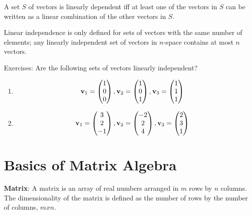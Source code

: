 \documentclass[]{book}
\theoremstyle{definition}
\theoremstyle{definition}
\theoremstyle{definition}
\theoremstyle{remark}
\begin{document}
A set \(S\) of vectors is linearly dependent iff at least one of the
vectors in \(S\) can be written as a linear combination of the other
vectors in \(S\).

Linear independence is only defined for sets of vectors with the same
number of elements; any linearly independent set of vectors in
\(n\)-space contains at most \(n\) vectors.

Exercises: Are the following sets of vectors linearly independent?

\begin{enumerate}
        \item $${\bf v}_1 = \begin{pmatrix} 1 \\ 0 \\ 0 \end{pmatrix} , {\bf v}_2 = \begin{pmatrix} 1 \\ 0 \\ 1 \end{pmatrix} , {\bf v}_3 = \begin{pmatrix} 1 \\ 1 \\ 1 \end{pmatrix} $$ 
            \phantom{Yes}
        \item $${\bf v}_1 = \begin{pmatrix} 3 \\ 2 \\ -1 \end{pmatrix} , {\bf v}_2 = \begin{pmatrix} -2 \\ 2 \\ 4 \end{pmatrix} , {\bf v}_3 = \begin{pmatrix} 2 \\ 3 \\ 1 \end{pmatrix} $$ 
\end{enumerate}

\section{Basics of Matrix Algebra}\label{basics-of-matrix-algebra}

\textbf{Matrix}: A matrix is an array of real numbers arranged in \(m\)
rows by \(n\) columns. The dimensionality of the matrix is defined as
the number of rows by the number of columns, \(m x n\).
\end{document}
